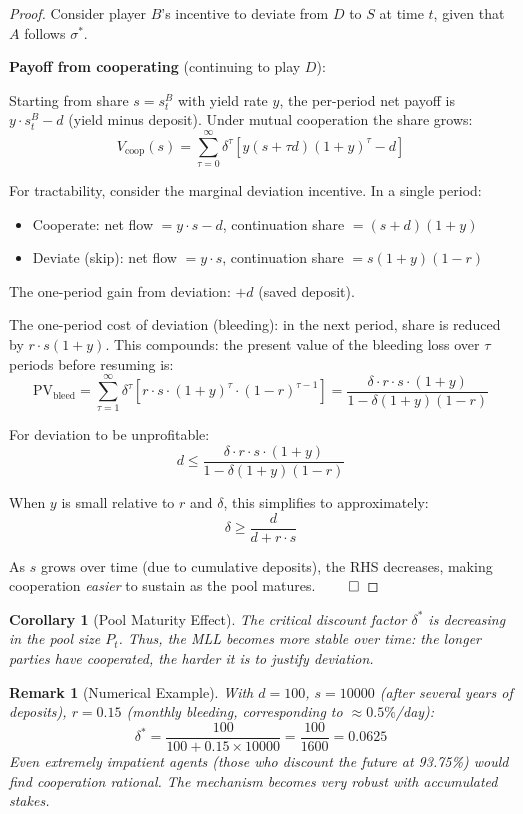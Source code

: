 \documentclass[12pt]{article}
\newtheorem{corollary}{Corollary}
\newtheorem{remark}{Remark}
\begin{document}
\begin{proof}
Consider player $B$'s incentive to deviate from $D$ to $S$ at time $t$, given that $A$ follows $\sigma^*$.

\textbf{Payoff from cooperating} (continuing to play $D$):

Starting from share $s = s_t^B$ with yield rate $y$, the per-period net payoff is $y \cdot s_t^B - d$ (yield minus deposit). Under mutual cooperation the share grows:
\[
V_{\text{coop}}(s) = \sum_{\tau=0}^{\infty} \delta^\tau \left[ y(s + \tau d)(1+y)^\tau - d \right]
\]

For tractability, consider the marginal deviation incentive. In a single period:
\begin{itemize}
    \item Cooperate: net flow $= y \cdot s - d$, continuation share $= (s+d)(1+y)$
    \item Deviate (skip): net flow $= y \cdot s$, continuation share $= s(1+y)(1-r)$
\end{itemize}

The one-period gain from deviation: $+d$ (saved deposit).

The one-period cost of deviation (bleeding): in the next period, share is reduced by $r \cdot s(1+y)$. This compounds: the present value of the bleeding loss over $\tau$ periods before resuming is:
\[
\text{PV}_{\text{bleed}} = \sum_{\tau=1}^{\infty} \delta^\tau \left[ r \cdot s \cdot (1+y)^\tau \cdot (1-r)^{\tau-1} \right]
= \frac{\delta \cdot r \cdot s \cdot (1+y)}{1 - \delta(1+y)(1-r)}
\]

For deviation to be unprofitable:
\[
d \leq \frac{\delta \cdot r \cdot s \cdot (1+y)}{1 - \delta(1+y)(1-r)}
\]

When $y$ is small relative to $r$ and $\delta$, this simplifies to approximately:
\[
\delta \geq \frac{d}{d + r \cdot s}
\]

As $s$ grows over time (due to cumulative deposits), the RHS decreases, making cooperation \textit{easier} to sustain as the pool matures. $\qed$
\end{proof}

\begin{corollary}[Pool Maturity Effect]
The critical discount factor $\delta^*$ is decreasing in the pool size $P_t$. Thus, the MLL becomes more stable over time: the longer parties have cooperated, the harder it is to justify deviation.
\end{corollary}

\begin{remark}[Numerical Example]
With $d = 100$, $s = 10000$ (after several years of deposits), $r = 0.15$ (monthly bleeding, corresponding to $\approx 0.5\%$/day):
\[
\delta^* = \frac{100}{100 + 0.15 \times 10000} = \frac{100}{1600} = 0.0625
\]
Even extremely impatient agents (those who discount the future at 93.75\%) would find cooperation rational. The mechanism becomes very robust with accumulated stakes.
\end{remark}
\end{document}
